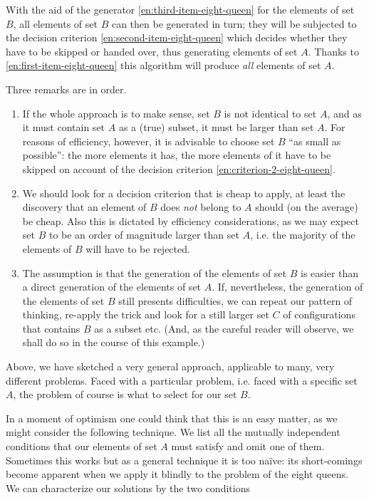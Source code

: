 With the aid of the generator \ref{en:third-item-eight-queen} for the elements of set $B$, all elements of set $B$ can then be generated in turn; they will be subjected to the decision criterion \ref{en:second-item-eight-queen} which decides whether they have to be skipped or handed over, thus generating elements of set $A$. Thanks to \ref{en:first-item-eight-queen} this algorithm will produce \textit{all} elements of set $A$.

Three remarks are in order.

\begin{enumerate}[wide, nosep, label=(\arabic*)]
	\item If the whole approach is to make sense, set $B$ is not identical to set $A$, and as it must contain set $A$ as a (true) subset, it must be larger than set $A$. For reasons of efficiency, however, it is advisable to choose set $B$ ``as small as possible'': the more elements it has, the more elements of it have to be skipped on account of the decision criterion \ref{en:criterion-2-eight-queen}.
	
	\item \label{en:criterion-2-eight-queen}
	We should look for a decision criterion that is cheap to apply, at least the discovery that an element of $B$ does \textit{not} belong to $A$ should (on the average) be cheap. Also this is dictated by efficiency considerations, as we may expect set $B$ to be an order of magnitude larger than set $A$, i.e. the majority of the elements of $B$ will have to be rejected.
	
	\item The assumption is that the generation of the elements of set $B$ is easier than a direct generation of the elements of set $A$. If, nevertheless, the generation of the elements of set $B$ still presents difficulties, we can repeat our pattern of thinking, re-apply the trick and look for a still larger set $C$ of configurations that contains $B$ as a subset etc. (And, as the careful reader will observe, we shall do so in the course of this example.)
\end{enumerate}

Above, we have sketched a very general approach, applicable to many, very different problems. Faced with a particular problem, i.e. faced with a specific set $A$, the problem of course is what to select for our set $B$.

In a moment of optimism one could think that this is an easy matter, as we might consider the following technique. We list all the mutually independent conditions that our elements of set $A$ must satisfy and omit one of them. Sometimes this works but as a general technique it is too naïve: its short-comings become apparent when we apply it blindly to the problem of the eight queens. We can characterize our solutions by the two conditions

